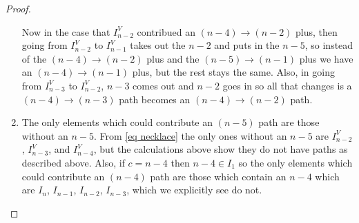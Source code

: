 \documentclass[11pt]{article}
\theoremstyle{remark}
\theoremstyle{definition}
\begin{document}
\begin{proof}
\begin{enumerate}
  Now in the case that $I_{n-2}^V$ contribued an $(n-4)\rightarrow (n-2)$ plus, then going from $I_{n-2}^V$ to $I_{n-1}^V$ takes out the $n-2$ and puts in the $n-5$, so instead of the $(n-4)\rightarrow (n-2)$ plus and the $(n-5)\rightarrow (n-1)$ plus we have an $(n-4)\rightarrow (n-1)$ plus, but the rest stays the same.  Also, in going from $I_{n-3}^V$ to $I_{n-2}^V$, $n-3$ comes out and $n-2$ goes in so all that changes is a $(n-4)\rightarrow (n-3)$ path becomes an $(n-4)\rightarrow (n-2)$ path.
\item The only elements which could contribute an $(n-5)$ path are those without an $n-5$.  From \eqref{eq necklace} the only ones without an $n-5$ are $I_{n-2}^V$, $I_{n-3}^V$, and $I_{n-4}^V$, but the calculations above show they do not have paths as described above.  Also, if $c=n-4$ then $n-4\in I_1$ so the only elements which could contribute an $(n-4)$ path are those which contain an $n-4$ which are $I_{n}$, $I_{n-1}$, $I_{n-2}$, $I_{n-3}$, which we explicitly see do not.
  \end{enumerate}
\end{proof}
\end{document}
